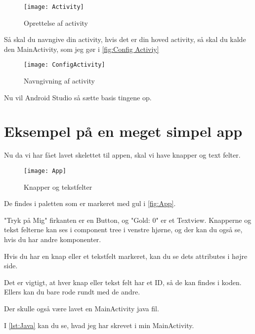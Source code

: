 \begin{figure}[h]
	\texttt{[image: Activity]}
	\caption{Oprettelse af activity}
	\label{fig:Activiy}
\end{figure}

Så skal du navngive din activity, hvis det er din hoved activity, så skal du kalde den MainActivity, som jeg gør i \autoref{fig:Config Activiy} 

\begin{figure}[h]
	\texttt{[image: ConfigActivity]}
	\caption{Navngivning af activity}
	\label{fig:Config Activiy}
\end{figure}

Nu vil Android Studio så sætte basis tingene op.

\FloatBarrier

\section{Eksempel på en meget simpel app}

Nu da vi har fået lavet skelettet til appen, skal vi have knapper og text felter.

\begin{figure}[h]
	\texttt{[image: App]}
	\caption{Knapper og tekstfelter}
	\label{fig:App}
\end{figure}

De findes i paletten som er markeret med gul i \autoref{fig:App}. 

"Tryk på Mig" firkanten er en Button, og "Gold: 0" er et Textview. 
Knapperne og tekst felterne kan ses i component tree i venstre hjørne, og der kan du også se, hvis du har andre komponenter.

Hvis du har en knap eller et tekstfelt markeret, kan du se dets attributes i højre side.

Det er vigtigt, at hver knap eller tekst felt har et ID, så de kan findes i koden. Ellers kan du bare rode rundt med de andre. 

Der skulle også være lavet en MainActivity java fil.

I \autoref{lst:Java} kan du se, hvad jeg har skrevet i min MainActivity. 

